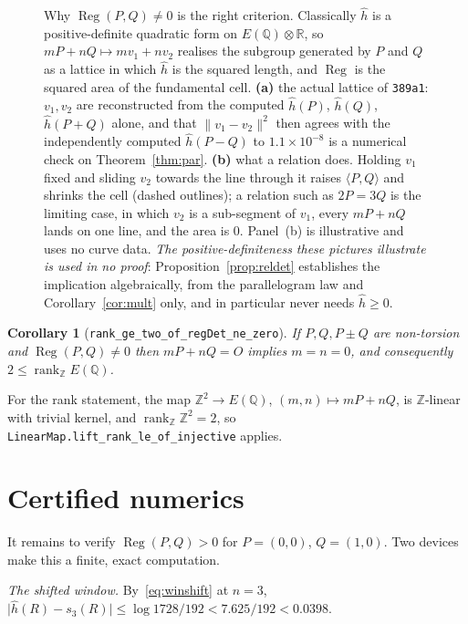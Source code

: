 \documentclass[11pt,reqno]{amsart}
\newcommand{\pffig}[1]{}
\theoremstyle{plain}
\newtheorem{corollary}[theorem]{Corollary}
\theoremstyle{definition}
\theoremstyle{remark}
\DeclareRobustCommand{\lt}[1]{\texttt{#1}}
\newcommand{\hh}{\widehat{h}}
\DeclareMathOperator{\reg}{Reg}
\begin{document}
\begin{figure}[htbp]
\centering
\pffig{fig_regulator_lattice}
\caption{Why $\reg(P,Q) \ne 0$ is the right criterion. Classically $\hh$ is a
positive-definite quadratic form on $E(\mathbb{Q})\otimes\mathbb{R}$, so
$mP+nQ \mapsto m v_1 + n v_2$ realises the subgroup generated by $P$ and $Q$
as a lattice in which $\hh$ is the squared length, and $\reg$ is the squared
area of the fundamental cell. \textbf{(a)} the actual lattice of
\texttt{389a1}: $v_1,v_2$ are reconstructed from the computed
$\hh(P)$, $\hh(Q)$, $\hh(P{+}Q)$ alone, and that $\lVert v_1-v_2\rVert^2$
then agrees with the independently computed $\hh(P{-}Q)$ to
$1.1\times10^{-8}$ is a numerical check on Theorem~\ref{thm:par}.
\textbf{(b)} what a relation does. Holding $v_1$ fixed and sliding $v_2$
towards the line through it raises $\langle P,Q\rangle$ and shrinks the cell
(dashed outlines); a relation such as $2P=3Q$ is the limiting case, in which
$v_2$ is a sub-segment of $v_1$, every $mP+nQ$ lands on one line, and the
area is $0$. Panel~(b) is illustrative and uses no curve data.
\emph{The positive-definiteness
these pictures illustrate is used in no proof}:
Proposition~\ref{prop:reldet} establishes the implication algebraically,
from the parallelogram law and Corollary~\ref{cor:mult} only, and in
particular never needs $\hh \ge 0$.}
\label{fig:lattice}
\end{figure}

\begin{corollary}[\lt{rank\_ge\_two\_of\_regDet\_ne\_zero}]\label{cor:crit}
If $P, Q, P{\pm}Q$ are non-torsion and $\reg(P,Q) \ne 0$ then
$mP + nQ = O$ implies $m = n = 0$, and consequently
$2 \le \operatorname{rank}_{\mathbb{Z}} E(\mathbb{Q})$.
\end{corollary}

For the rank statement, the map
$\mathbb{Z}^2 \to E(\mathbb{Q})$, $(m,n) \mapsto mP + nQ$, is
$\mathbb{Z}$-linear with trivial kernel, and
$\operatorname{rank}_{\mathbb{Z}} \mathbb{Z}^2 = 2$, so
\lt{LinearMap.lift\_rank\_le\_of\_injective} applies.

\section{Certified numerics}\label{sec:numerics}

It remains to verify $\reg(P,Q) > 0$ for $P = (0,0)$, $Q = (1,0)$. Two
devices make this a finite, exact computation.

\emph{The shifted window.} By~\eqref{eq:winshift} at $n = 3$,
$\lvert \hh(R) - s_3(R)\rvert \le \log 1728/192 < 7.625/192 < 0.0398$.
\end{document}
